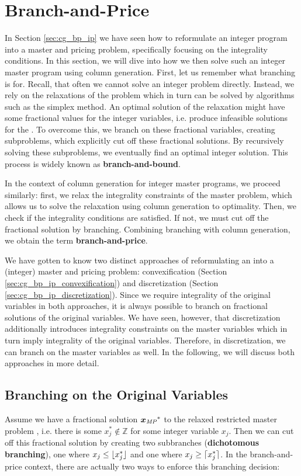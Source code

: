 \section{Branch-and-Price}\label{sec:cg_bp_bp}
In Section \ref{sec:cg_bp_ip} we have seen how to reformulate an integer program into a master and pricing problem, specifically focusing on the integrality conditions. In this section, we will dive into how we then solve such an integer master program using column generation. First, let us remember what branching is for. Recall, that often we cannot solve an integer problem directly. Instead, we rely on the \LP{} relaxations of the problem which in turn can be solved by algorithms such as the simplex method. An optimal solution of the \LP{} relaxation might have some fractional values for the integer variables, i.e. produce infeasible solutions for the \IP{}. To overcome this, we branch on these fractional variables, creating subproblems, which explicitly cut off these fractional solutions. By recursively solving these subproblems, we eventually find an optimal integer solution. This process is widely known as \textbf{branch-and-bound}.

In the context of column generation for integer master programs, we proceed similarly: first, we relax the integrality constraints of the master problem, which allows us to solve the relaxation using column generation to optimality. Then, we check if the integrality conditions are satisfied. If not, we must cut off the fractional solution by branching. Combining branching with column generation, we obtain the term \textbf{branch-and-price}.

We have gotten to know two distinct approaches of reformulating an \IP{} into a (integer) master and pricing problem: convexification (Section \ref{sec:cg_bp_ip_convexification}) and discretization (Section \ref{sec:cg_bp_ip_discretization}). Since we require integrality of the original variables in both approaches, it is always possible to branch on fractional solutions of the original variables. We have seen, however, that discretization additionally introduces integrality constraints on the master variables which in turn imply integrality of the original variables. Therefore, in discretization, we can branch on the master variables as well. In the following, we will discuss both approaches in more detail.

\subsection{Branching on the Original Variables}\label{sec:cg_bp_bp_branching_original}
Assume we have a fractional solution ${\bm{x}}_{\textit{MP}}{}^*$ to the relaxed restricted master problem \RMP{}, i.e. there is some $x_j^* \not\in \mathbb{Z}$ for some integer variable $x_j$. Then we can cut off this fractional solution by creating two subbranches (\textbf{dichotomous branching}), one where $x_j \leq \lfloor x_j^*\rfloor$ and one where $x_j \geq \lceil x_j^*\rceil$. In the branch-and-price context, there are actually two ways to enforce this branching decision:

